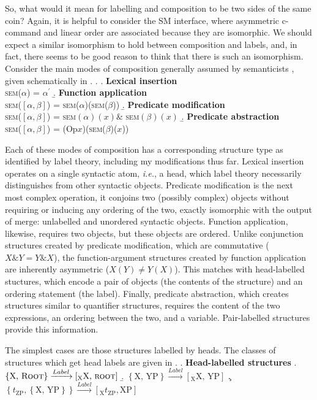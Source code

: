 \documentclass[MilwayThesis]{subfiles}
\begin{document}
So, what would it mean for labelling and composition to be two sides of the same coin?
Again, it is helpful to consider the SM interface, where asymmetric c-command and linear order are associated because they are isomorphic.
We should expect a similar isomorphism to hold between composition and labels, and, in fact, there seems to be good reason to think that there is such an isomorphism.
Consider the main modes of composition generally assumed by semanticists \parencite[\textit{e.g.}, by][]{heimkratzer1998semantics}, given schematically in \Next.
\ex. 
\a. \textbf{Lexical insertion}\\
\textsc{sem}($\alpha$) = $\alpha^\prime$
\b. \textbf{Function application}\\
\textsc{sem}($\left[ \alpha, \beta \right]$) = \textsc{sem}($\alpha$)(\textsc{sem}($\beta$))
\b. \textbf{Predicate modification}\\
\textsc{sem}($\left[ \alpha, \beta \right]$) = \textsc{sem}$(\alpha)(x) \&$ \textsc{sem}$(\beta)(x)$
\b. \textbf{Predicate abstraction}\\
\textsc{sem}($\left[ \alpha, \beta \right]$) = (Op$x$)(\textsc{sem}($\beta$)($x$))

Each of these modes of composition has a corresponding structure type as identified by label theory, including my modifications thus far.
Lexical insertion operates on a single syntactic atom, \textit{i.e.}, a head, which label theory necessarily distinguishes from other syntactic objects.
Predicate modification is the next most complex operation, it conjoins two (possibly complex) objects without requiring or inducing any ordering of the two, exactly isomorphic with the output of merge: unlabelled and unordered syntactic objects.
Function application, likewise, requires two objects, but these objects are ordered.
Unlike conjunction structures created by predicate modification, which are commutative ($X \& Y = Y \& X$), the function-argument structures created by function application are inherently asymmetric ($X(Y) \neq Y(X)$).
This matches with head-labelled stuctures, which encode a pair of objects (the contents of the structure) and an ordering statement (the label).
Finally, predicate abstraction, which creates structures similar to quantifier structures, requires the content of the two expressions, an ordering between the two, and a variable.
Pair-labelled structures provide this information.

The simplest cases are those structures labelled by heads.
The classes of structures which get head labels are given in \Next.
\ex. \textbf{Head-labelled structures}
\a. $\left\{ \text{X, }\textsc{Root} \right\} \xrightarrow{Label} \left[_\text{X} \text{X, }\textsc{root}  \right]$
\b. $\left\{ \text{X, YP} \right\} \xrightarrow{Label} \left[_\text{X} \text{X, YP} \right]$
\c. $\left\{ t_\text{ZP}, \left\{ \text{X, YP} \right\} \right\}\xrightarrow{Label}\left[_\text{X} t_\text{ZP}, \text{XP} \right]$
\end{document}
